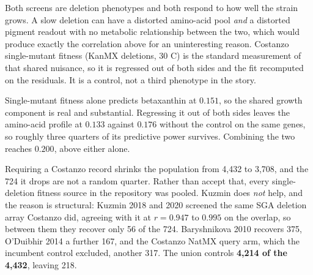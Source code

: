 Both screens are deletion phenotypes and both respond to how well the strain grows. A slow
deletion can have a distorted amino-acid pool \emph{and} a distorted pigment readout with
no metabolic relationship between the two, which would produce exactly the correlation
above for an uninteresting reason. Costanzo single-mutant fitness (KanMX deletions, 30 C)
is the standard measurement of that shared nuisance, so it is regressed out of both sides
and the fit recomputed on the residuals. It is a control, not a third phenotype in the
story.

Single-mutant fitness alone predicts betaxanthin at $0.151$, so the shared growth component
is real and substantial. Regressing it out of both sides leaves the amino-acid profile at
$0.133$ against $0.176$ without the control on the same genes, so roughly three quarters of
its predictive power survives. Combining the two reaches $0.200$, above either alone.

Requiring a Costanzo record shrinks the population from 4,432 to 3,708, and the 724 it drops
are not a random quarter. Rather than accept that, every single-deletion fitness source in
the repository was pooled. Kuzmin does \emph{not} help, and the reason is structural: Kuzmin
2018 and 2020 screened the same SGA deletion array Costanzo did, agreeing with it at
$r = 0.947$ to $0.995$ on the overlap, so between them they recover only 56 of the 724.
Baryshnikova 2010 recovers 375, O'Duibhir 2014 a further 167, and the Costanzo NatMX query
arm, which the incumbent control excluded, another 317. The union controls \textbf{4,214 of
the 4,432}, leaving 218.

